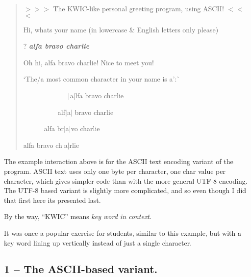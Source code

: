 \begin{quote}
{\ttfamily $>$$>$$>$ The K\+W\+I\+C-\/like personal greeting program, using A\+S\+C\+I\+I! $<$$<$$<$}

{\ttfamily Hi, what\textquotesingle{}s your name (in lowercase \& English letters only please)}

{\ttfamily ?} {\itshape {\bfseries{alfa bravo charlie}}}

{\ttfamily Oh hi, alfa bravo charlie! Nice to meet you!}

`The/a most common character in your name is \textquotesingle{}a'\+:\`{}

{\ttfamily ~~~~~~~~~~~~~$\vert$a$\vert$lfa bravo charlie}

{\ttfamily ~~~~~~~~~~alf$\vert$a$\vert$ bravo charlie}

{\ttfamily ~~~~~~alfa br$\vert$a$\vert$vo charlie}

{\ttfamily alfa bravo ch$\vert$a$\vert$rlie}

\end{quote}


The example interaction above is for the A\+S\+C\+II text encoding variant of the program. A\+S\+C\+II text uses only one byte per character, one {\ttfamily char} value per character, which gives simpler code than with the more general U\+T\+F-\/8 encoding. The U\+T\+F-\/8 based variant is slightly more complicated, and so even though I did that first here it\textquotesingle{}s presented last.

By the way, “\+K\+W\+I\+C” means {\itshape key word in context}.

It was once a popular exercise for students, similar to this example, but with a key word lining up vertically instead of just a single character.

\subsection*{1 – The A\+S\+C\+I\+I-\/based variant.}


